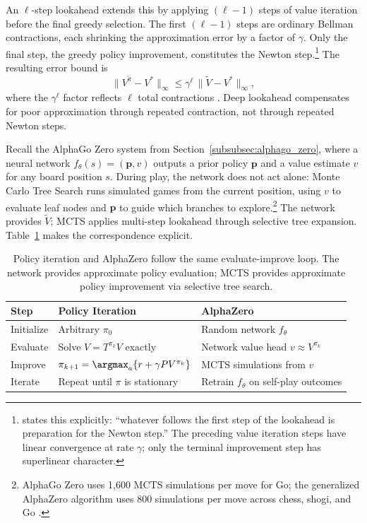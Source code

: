 An $\ell$-step lookahead extends this by applying $(\ell - 1)$ steps of value iteration before the final greedy selection. The first $(\ell - 1)$ steps are ordinary Bellman contractions, each shrinking the approximation error by a factor of $\gamma$. Only the final step, the greedy policy improvement, constitutes the Newton step.\footnote{\citet{bertsekas2021lessons} states this explicitly: ``whatever follows the first step of the lookahead is preparation for the Newton step.'' The preceding value iteration steps have linear convergence at rate $\gamma$; only the terminal improvement step has superlinear character.} The resulting error bound is
\begin{equation}
\|V^{\tilde{\pi}} - V^*\|_\infty \leq \gamma^\ell \, \|\tilde{V} - V^*\|_\infty,
\end{equation}
where the $\gamma^\ell$ factor reflects $\ell$ total contractions \citep[Prop.~2.3.1]{bertsekas2022}. Deep lookahead compensates for poor approximation through repeated contraction, not through repeated Newton steps.

Recall the AlphaGo Zero system from Section~\ref{subsubsec:alphago_zero}, where a neural network $f_\theta(s) = (\mathbf{p}, v)$ outputs a prior policy $\mathbf{p}$ and a value estimate $v$ for any board position $s$. During play, the network does not act alone: Monte Carlo Tree Search runs simulated games from the current position, using $v$ to evaluate leaf nodes and $\mathbf{p}$ to guide which branches to explore.\footnote{AlphaGo Zero uses 1,600 MCTS simulations per move for Go; the generalized AlphaZero algorithm uses 800 simulations per move across chess, shogi, and Go \citep[Table~S3]{Silver2018}.} The network provides $\tilde{V}$; MCTS applies multi-step lookahead through selective tree expansion. Table~\ref{tab:pi_alphazero} makes the correspondence explicit.

\begin{table}[h]
\centering
\small
\begin{tabular}{lll}
\hline
Step & Policy Iteration & AlphaZero \\
\hline
Initialize & Arbitrary $\pi_0$ & Random network $f_\theta$ \\
Evaluate & Solve $V = T^{\pi_k} V$ exactly & Network value head $v \approx V^{\pi_k}$ \\
Improve & $\pi_{k+1} = \argmax_a \{r + \gamma P V^{\pi_k}\}$ & MCTS simulations from $v$ \\
Iterate & Repeat until $\pi$ is stationary & Retrain $f_\theta$ on self-play outcomes \\
\hline
\end{tabular}
\caption{Policy iteration and AlphaZero follow the same evaluate-improve loop. The network provides approximate policy evaluation; MCTS provides approximate policy improvement via selective tree search.}
\label{tab:pi_alphazero}
\end{table}

